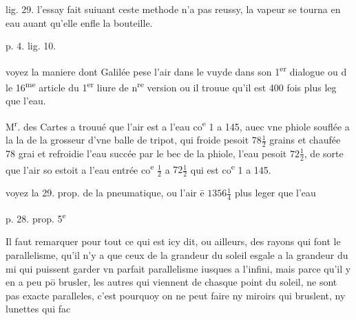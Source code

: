 \documentclass[11pt,a4paper]{article}
\begin{document}
lig. 29. l'essay fait suiuant ceste methode n'a pas reussy, la vapeur se tourna en eau auant qu'elle enfle la bouteille.

p. 4. lig. 10.

voyez la maniere dont Galilée pese l'air dans le vuyde dans son 1\textsuperscript{er} dialogue ou d le 16\textsuperscript{me} article du 1\textsuperscript{er} liure de n\textsuperscript{re} version ou il trouue qu'il est 400 fois plus leg que l'eau.

M\textsuperscript{r}. des Cartes a trouué que l'air est a l'eau co\textsuperscript{e} 1 a 145, auec vne phiole souflée a la la\ill{} de la grosseur d'vne balle de tripot, qui froide pesoit $78\frac{1}{2}$ grains et chaufée 78 grai et refroidie l'eau succée par le bec de la phiole, l'eau pesoit $72\frac{1}{2}$, de sorte que l'air so estoit a l'eau entrée co\textsuperscript{e} $\frac{1}{2}$ a $72\frac{1}{2}$ qui est co\textsuperscript{e} 1 a 145.

voyez la 29. prop. de la pneumatique, ou l'air ē $1356\frac{1}{4}$ plus leger que l'eau

p. 28. prop. 5\textsuperscript{e}

Il faut remarquer pour tout ce qui est icy dit, ou ailleurs, des rayons qui font le parallelisme, qu'il n'y a que ceux de la grandeur du soleil esgale a la grandeur du mi qui puissent garder vn parfait parallelisme iusques a l'infini, mais parce qu'il y en a \ill{} peu pō brusler, les autres qui viennent de chasque point du soleil, ne sont pas exacte paralleles, c'est pourquoy on ne peut faire ny miroirs qui bruslent, ny lunettes qui fac

\end{document}
